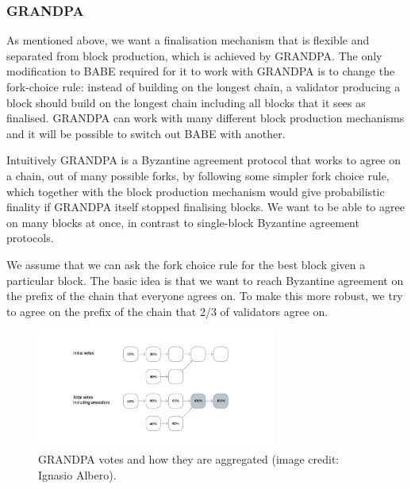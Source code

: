 


\subsubsection{GRANDPA} \label{sec:grandpa}


As mentioned above, we want a finalisation mechanism that is flexible and separated from block production, which is achieved by GRANDPA. The only modification to BABE required for it to work with GRANDPA is to change the fork-choice rule: instead of building on the longest chain, a validator producing a block should build on the longest chain including all blocks that it sees as finalised. GRANDPA can work with many different block production mechanisms and it will be possible to switch out BABE with another.

Intuitively GRANDPA is a Byzantine agreement protocol that works to agree on a chain, out of many possible forks, by following some simpler fork choice rule, which together with the block production mechanism would give probabilistic finality if GRANDPA itself stopped finalising blocks. We want to be able to agree on many blocks at once, in contrast to single-block Byzantine agreement protocols.

We assume that we can ask the fork choice rule for the best block given a particular block. The basic idea is that we want to reach Byzantine agreement on the prefix of the chain that everyone agrees on. To make this more robust, we try to agree on the prefix of the chain that 2/3 of validators agree on.

\begin{figure}[h!]
  \centering
  \includegraphics[width=0.7\textwidth]{images/Grandpa.png}
  \caption{GRANDPA votes and how they are aggregated (image credit: Ignasio Albero).}
    \label{fig:grandpa}
\end{figure}

